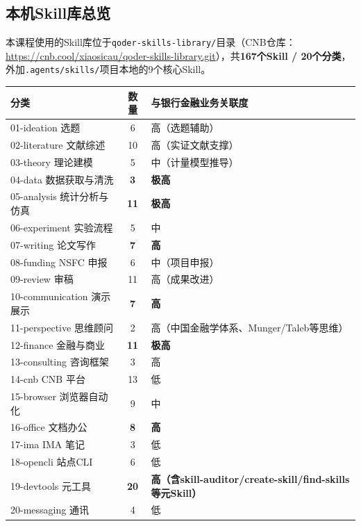 \subsection{本机Skill库总览}

本课程使用的Skill库位于\texttt{qoder-skills-library/}目录（CNB仓库：\url{https://cnb.cool/xiaosicau/qoder-skills-library.git}），共\textbf{167个Skill / 20个分类}，外加\texttt{.agents/skills/}项目本地的9个核心Skill。

\begin{table}[H]
\centering
\begin{tabular}{lcp{9cm}}
\toprule
\textbf{分类} & \textbf{数量} & \textbf{与银行金融业务关联度} \\
\midrule
01-ideation 选题 & 6 & 高（选题辅助） \\
02-literature 文献综述 & 10 & 高（实证文献支撑） \\
03-theory 理论建模 & 5 & 中（计量模型推导） \\
\rowcolor{yellow!20}04-data 数据获取与清洗 & \textbf{3} & \textbf{极高} \\
\rowcolor{yellow!20}05-analysis 统计分析与仿真 & \textbf{11} & \textbf{极高} \\
06-experiment 实验流程 & 5 & 中 \\
\rowcolor{yellow!20}07-writing 论文写作 & \textbf{7} & \textbf{高} \\
08-funding NSFC 申报 & 6 & 中（项目申报） \\
09-review 审稿 & 11 & 高（成果改进） \\
\rowcolor{yellow!20}10-communication 演示展示 & \textbf{7} & \textbf{高} \\
11-perspective 思维顾问 & 2 & 高（中国金融学体系、Munger/Taleb等思维） \\
\rowcolor{yellow!20}12-finance 金融与商业 & \textbf{11} & \textbf{极高} \\
13-consulting 咨询框架 & 3 & 高 \\
14-cnb CNB 平台 & 13 & 低 \\
15-browser 浏览器自动化 & 9 & 中 \\
\rowcolor{yellow!20}16-office 文档办公 & \textbf{8} & \textbf{高} \\
17-ima IMA 笔记 & 3 & 低 \\
18-opencli 站点CLI & 6 & 低 \\
\rowcolor{yellow!20}19-devtools 元工具 & \textbf{20} & \textbf{高（含skill-auditor/create-skill/find-skills等元Skill）} \\
20-messaging 通讯 & 4 & 低 \\
\bottomrule
\end{tabular}
\end{table}

